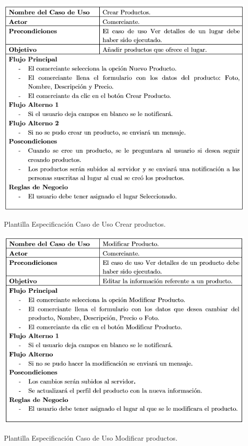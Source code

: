 \documentclass[12pt,letterpaper,openany]{book}
\begin{document}
\begin{table}[H]
\centering
\includegraphics[width=13cm]{./imagenes/PCU/crear_productos}
\caption{Plantilla Especificación Caso de Uso Crear productos.}
\end{table}

\begin{table}[H]
\centering
\includegraphics[width=13cm]{./imagenes/PCU/modificar_producto}
\caption{Plantilla Especificación Caso de Uso Modificar productos.}
\end{table}
\end{document}

